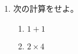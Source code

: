 \documentclass{jlreq}
\begin{document}
\begin{enumerate}
    \item 次の計算をせよ。
    \begin{enumerate}
        \item $1+1$
        \item $2\times 4$
    \end{enumerate}
\end{enumerate}
\end{document}
